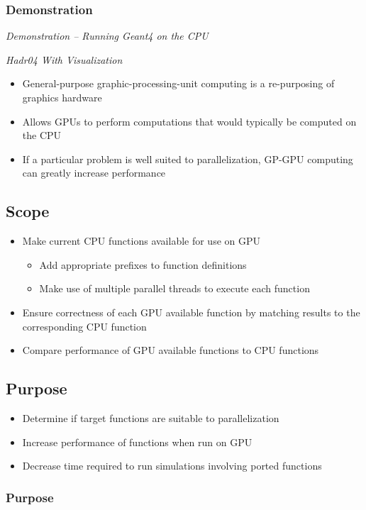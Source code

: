 \documentclass{beamer}
\begin{document}
\begin{frame}
\frametitle{Demonstration}
\begin{center}
\emph{Demonstration -- Running Geant4 on the CPU}

\emph{Hadr04 With Visualization}
\end{center}
\end{frame}

\begin{frame}
\begin{itemize}
\frametitle{What is GP-GPU Computing?}
\item General-purpose graphic-processing-unit computing is a re-purposing of graphics hardware
\item Allows GPUs  to perform computations that would typically be computed on the CPU
\item If a particular problem is well suited to parallelization, GP-GPU computing can greatly increase performance
\end{itemize}
\end{frame}

\subsection{Scope}
\begin{frame}
\begin{itemize}
\frametitle{Scope}
\item Make current CPU functions available for use on GPU
\begin{itemize}
\item Add appropriate prefixes to function definitions
\item Make use of multiple parallel threads to execute each function
\end{itemize}
\item Ensure correctness of each GPU available function by matching results to the corresponding CPU function
\item Compare performance of GPU available functions to CPU functions
\end{itemize}
\end{frame}

\subsection{Purpose}
\begin{frame}
\begin{itemize}
\item Determine if target functions are suitable to parallelization 
\item Increase performance of functions when run on GPU
\item Decrease time required to run simulations involving ported functions
\end{itemize}
\frametitle{Purpose}
\end{frame}
\end{document}

